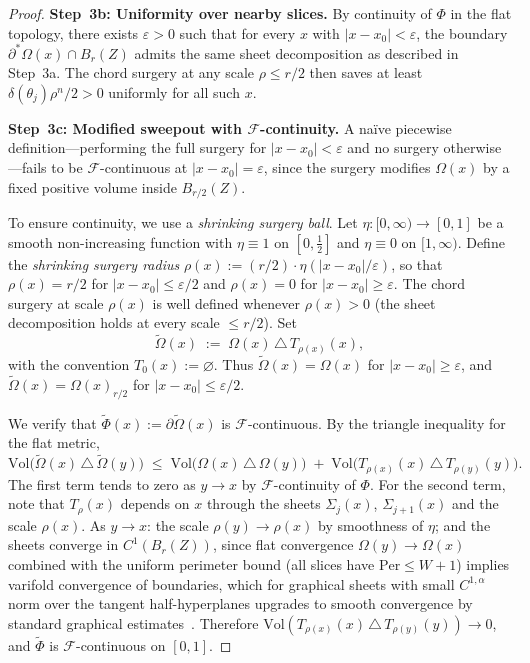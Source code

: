 \begin{proof}
\medskip\noindent\textbf{Step~3b: Uniformity over nearby slices.}
By continuity of $\Phi$ in the flat topology, there exists $\varepsilon > 0$ such that for every $x$ with $|x - x_0| < \varepsilon$, the boundary $\partial^*\Omega(x) \cap B_r(Z)$ admits the same sheet decomposition as described in Step~3a. The chord surgery at any scale $\rho \leq r/2$ then saves at least $\delta(\theta_j)\rho^n/2 > 0$ uniformly for all such $x$.

\medskip\noindent\textbf{Step~3c: Modified sweepout with $\mathcal{F}$-continuity.}
A na\"ive piecewise definition---performing the full surgery for $|x - x_0| < \varepsilon$ and no surgery otherwise---fails to be $\mathcal{F}$-continuous at $|x - x_0| = \varepsilon$, since the surgery modifies $\Omega(x)$ by a fixed positive volume inside $B_{r/2}(Z)$.

To ensure continuity, we use a \emph{shrinking surgery ball}. Let $\eta \colon [0,\infty) \to [0,1]$ be a smooth non-increasing function with $\eta \equiv 1$ on $[0, \tfrac{1}{2}]$ and $\eta \equiv 0$ on $[1, \infty)$. Define the \emph{shrinking surgery radius} $\rho(x) := (r/2)\cdot\eta(|x - x_0|/\varepsilon)$, so that $\rho(x) = r/2$ for $|x - x_0| \leq \varepsilon/2$ and $\rho(x) = 0$ for $|x - x_0| \geq \varepsilon$. The chord surgery at scale $\rho(x)$ is well defined whenever $\rho(x) > 0$ (the sheet decomposition holds at every scale $\leq r/2$). Set
\[
    \tilde{\Omega}(x) \;:=\; \Omega(x) \,\triangle\, T_{\rho(x)}(x),
\]
with the convention $T_0(x) := \varnothing$. Thus $\tilde{\Omega}(x) = \Omega(x)$ for $|x - x_0| \geq \varepsilon$, and $\tilde{\Omega}(x) = \Omega(x)_{r/2}$ for $|x - x_0| \leq \varepsilon/2$.

We verify that $\tilde{\Phi}(x) := \partial\tilde{\Omega}(x)$ is $\mathcal{F}$-continuous. By the triangle inequality for the flat metric,
\[
    \mathrm{Vol}\big(\tilde{\Omega}(x) \,\triangle\, \tilde{\Omega}(y)\big)
    \;\leq\; \mathrm{Vol}\big(\Omega(x) \,\triangle\, \Omega(y)\big)
    \;+\; \mathrm{Vol}\big(T_{\rho(x)}(x) \,\triangle\, T_{\rho(y)}(y)\big).
\]
The first term tends to zero as $y \to x$ by $\mathcal{F}$-continuity of $\Phi$. For the second term, note that $T_\rho(x)$ depends on $x$ through the sheets $\Sigma_j(x)$, $\Sigma_{j+1}(x)$ and the scale $\rho(x)$. As $y \to x$: the scale $\rho(y) \to \rho(x)$ by smoothness of $\eta$; and the sheets converge in $C^1(B_r(Z))$, since flat convergence $\Omega(y) \to \Omega(x)$ combined with the uniform perimeter bound (all slices have $\mathrm{Per} \leq W + 1$) implies varifold convergence of boundaries, which for graphical sheets with small $C^{1,\alpha}$ norm over the tangent half-hyperplanes upgrades to smooth convergence by standard graphical estimates~\cite[Theorem~24.2]{Sim84}. Therefore $\mathrm{Vol}(T_{\rho(x)}(x) \,\triangle\, T_{\rho(y)}(y)) \to 0$, and $\tilde{\Phi}$ is $\mathcal{F}$-continuous on $[0,1]$.


\end{proof}
